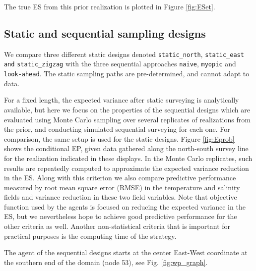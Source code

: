\documentclass[aoas]{imsart}
\begin{document}
The true ES from this prior realization is plotted in Figure \ref{fig:ESet}.

\subsection{Static and sequential sampling designs}


We compare three different static designs denoted \texttt{static\_north}, \texttt{static\_east and} \texttt{static\_zigzag} with the three sequential approaches \texttt{naive}, \texttt{myopic} and \texttt{look-ahead}. The static sampling paths are pre-determined, and cannot adapt to data. 

For a fixed length, the expected variance after static surveying is analytically available, but here we focus on the properties of the sequential designs which are evaluated using Monte Carlo sampling over several replicates of realizations from the prior, and conducting simulated sequential surveying for each one. For comparison, the same setup is used for the static designs. Figure \ref{fig:Eprob} shows the conditional EP, given data gathered along the north-south survey line for the realization indicated in these displays. In the Monte Carlo replicates, such results are repeatedly computed to approximate the expected variance reduction in the ES. Along with this criterion we also compare predictive performance measured by root mean square error (RMSE) in the temperature and salinity fields and variance reduction in these two field variables. Note that objective function used by the agents is focused on reducing the expected variance in the ES, but we nevertheless hope to achieve good predictive performance for the other criteria as well. Another non-statistical criteria that is important for practical purposes is the computing time of the strategy. 

The agent of the sequential designs starts at the center East-West coordinate at the southern end of the domain (node 53), see Fig. \ref{fig:wp_graph}.
\end{document}
